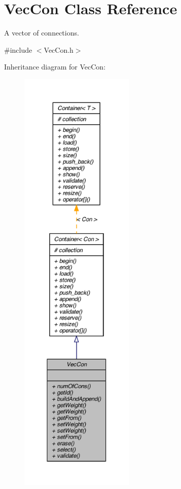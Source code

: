 \hypertarget{class_vec_con}{
\section{VecCon Class Reference}
\label{class_vec_con}
}


A vector of connections.  




{\ttfamily \#include $<$VecCon.h$>$}



Inheritance diagram for VecCon:\nopagebreak
\begin{figure}[H]
\begin{center}
\leavevmode
\includegraphics[height=600pt]{class_vec_con__inherit__graph}
\end{center}
\end{figure}



